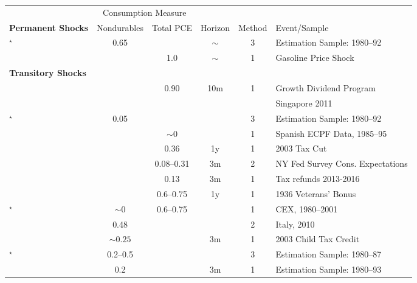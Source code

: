 \begin{tabular}{p{8cm}ccccl}
\toprule
&  \multicolumn{2}{c}{Consumption Measure}&&&\\
\cmidrule(r){2-3}
\textbf{Permanent Shocks} & \multicolumn{1}{c}{Nondurables} & \multicolumn{1}{c}{Total PCE}& Horizon & Method & Event/Sample \\
\midrule
\citet{blundell_consumption_2008}$^\star$ & 0.65& & $\sim$ & 3  & Estimation Sample: 1980--92\\
\citet{gelman_response_2016} &  & 1.0 & $\sim$ & 1  & Gasoline Price Shock \\
\textbf{Transitory Shocks} \\
\midrule
\citet{agarwal_consumption_2014} &  & 0.90 & 10m & 1 & Growth Dividend Program \\
 & & & & & Singapore 2011\\
\citet{blundell_consumption_2008}$^\star$ & 0.05& & & 3  & Estimation Sample: 1980--92\\
\citet{browningCollado:AntIncChanges} &  & \multicolumn{1}{c}{$\sim0$} && 1& Spanish ECPF Data, 1985--95\\
\citet{coronadoEtAl} & & \multicolumn{1}{c}{0.36} & 1y & 1 &2003 Tax Cut\\
\citet{fuster_what_2018} & & \multicolumn{1}{c}{0.08--0.31}   & 3m & 2 & NY Fed Survey Cons. Expectations\\
\citet{gelman_what_2016} & &\multicolumn{1}{c}{0.13}   & 3m & 1 & Tax refunds 2013-2016\\
\citet{hausmanVeteransBonus} & &   \multicolumn{1}{c}{0.6--0.75} & 1y & 1 & 1936 Veterans' Bonus\\
\citet{hsieh:alaska}$^\star$ & \multicolumn{1}{c}{$\sim0$}  &  \multicolumn{1}{c}{0.6--0.75} & & 1  & CEX, 1980--2001\\
\citet{jappelli_fiscal_2014} & \multicolumn{1}{c}{0.48} & & & 2  & Italy, 2010 \\
\citet{johnsonEtAl:2003childTaxCredit} & \multicolumn{1}{c}{$\sim0.25$} &  & 3m & 1  & 2003 Child Tax Credit \\
\citet{lusardi}$^\star$ & \multicolumn{1}{c}{0.2--0.5} & & & 3  & Estimation Sample: 1980--87\\
\citet{parkerSocSec} & 0.2 &  & 3m & 1  & Estimation Sample: 1980--93\\

\end{tabular}
